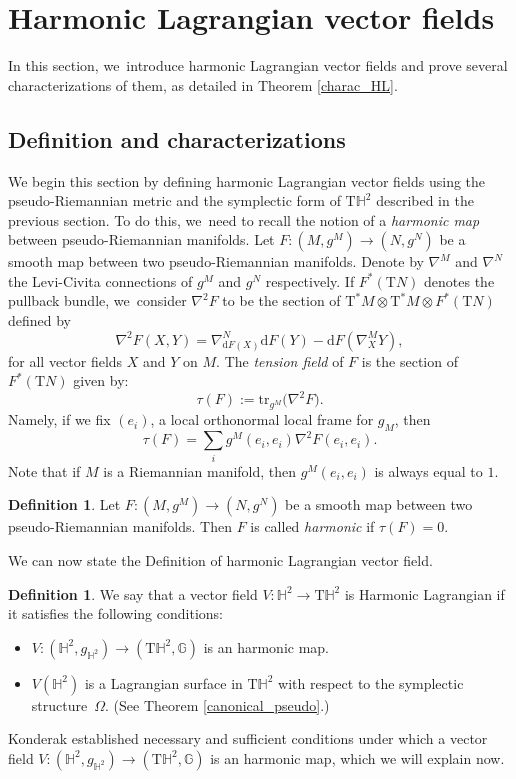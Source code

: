 \documentclass[10pt]{amsart}
\theoremstyle{plain}
\theoremstyle{definition}
\newtheorem{defi}[cor]{Definition}
\begin{document}
\section{Harmonic Lagrangian vector fields}\label{sec5_harmo}

In this section, we~introduce harmonic Lagrangian vector fields and prove several characterizations of them, as detailed in Theorem \ref{charac_HL}.

\subsection{Definition and characterizations}
We begin this section by defining harmonic Lagrangian vector fields using the pseudo-Riemannian metric and the symplectic form of $\mathrm{T}\mathbb{H}^2$ described in the previous section. To do this, we~need to recall the notion of a \emph{harmonic map} between pseudo-Riemannian manifolds.
Let $F:(M,g^M)\to(N,g^N)$ be a smooth map between two pseudo-Riemannian manifolds. Denote by $\nabla^{M}$ and $\nabla^{N}$ the Levi-Civita connections of $g^M$ and $g^N$ respectively. If $F^*(\mathrm{T}N)$
denotes the pullback bundle, we~consider $\nabla^2F$ to be the section of $\mathrm{T}^*M\otimes \mathrm{T}^*M\otimes F^*(\mathrm{T}N)$ defined by
\[
\nabla^2F(X,Y)=\nabla_{\mathrm{d}F(X)}^{N}\mathrm{d}F(Y)-\mathrm{d}F(\nabla^{M}_XY),
\]
for all vector fields $X$ and $Y$ on $M$.
The \emph{tension field} of $F$ is the section of $F^*(\mathrm{T}N)$ given by:
\[
\tau(F):=\mathrm{tr}_{g^{M}}\big(\nabla^2F \big).
\]
Namely, if we fix $(e_i)$, a local orthonormal local frame for $g_M$, then
\[
\tau(F)=\sum_{i}g^M(e_i,e_i)\nabla^2F(e_i,e_i).
\]
Note that if $M$ is a Riemannian manifold, then $g^{M}(e_i,e_i)$ is always equal to $1$.
\begin{defi}\label{harmonic_def}
Let $F:(M,g^M)\to(N,g^N)$ be a smooth map between two pseudo-Riemannian manifolds. Then $F$ is called \emph{harmonic} if $\tau(F)=0$.
\end{defi}
We can now state the Definition of harmonic Lagrangian vector field.
\begin{defi}\label{def1}
We say that a vector field $V:\mathbb{H}^2\to\mathrm{T}\mathbb{H}^2$ is Harmonic Lagrangian if it satisfies the following conditions:
\begin{itemize}
\item $V:(\mathbb{H}^2,g_{\mathbb{H}^2})\to(\mathrm{T}\mathbb{H}^2,\mathbb{G})$ is an harmonic map.
\item $V(\mathbb{H}^2)$ is a Lagrangian surface in $\mathrm{T}\mathbb{H}^2$ with respect to the symplectic structure~$\Omega$. (See Theorem \ref{canonical_pseudo}.)
\end{itemize}
\end{defi}
Konderak \cite{on_harmonic_vector_field} established necessary and sufficient conditions under which a vector field $V:(\mathbb{H}^2,g_{\mathbb{H}^2})\to(\mathrm{T}\mathbb{H}^2,\mathbb{G})$ is an harmonic map, which we will explain now.
\end{document}
